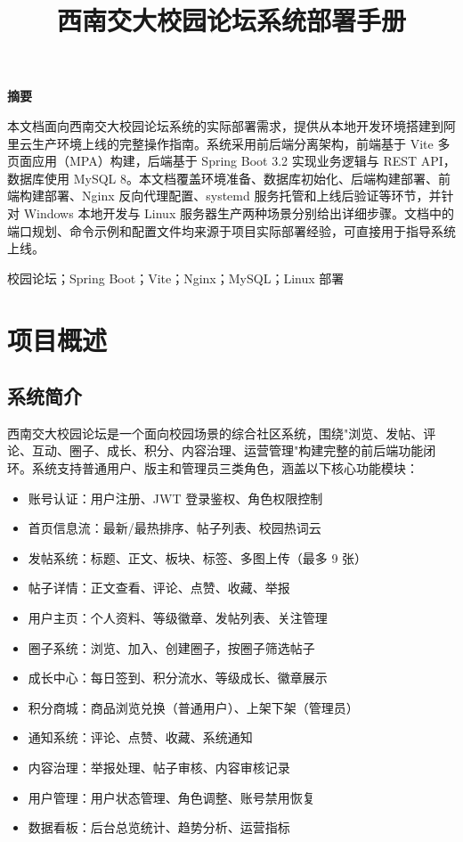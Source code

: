 \documentclass[bwprint]{report}
\title{西南交大校园论坛系统部署手册}
\begin{document}
\maketitle
\newpage

\pagestyle{plain}
\begin{center}
    {\bfseries 摘要}
\end{center}

本文档面向西南交大校园论坛系统的实际部署需求，提供从本地开发环境搭建到阿里云生产环境上线的完整操作指南。系统采用前后端分离架构，前端基于 Vite 多页面应用（MPA）构建，后端基于 Spring Boot 3.2 实现业务逻辑与 REST API，数据库使用 MySQL 8。本文档覆盖环境准备、数据库初始化、后端构建部署、前端构建部署、Nginx 反向代理配置、systemd 服务托管和上线后验证等环节，并针对 Windows 本地开发与 Linux 服务器生产两种场景分别给出详细步骤。文档中的端口规划、命令示例和配置文件均来源于项目实际部署经验，可直接用于指导系统上线。

\vspace{0.5em}
校园论坛；Spring Boot；Vite；Nginx；MySQL；Linux 部署

\newpage
\tableofcontents
\newpage
\pagestyle{plain}

\setcounter{page}{1}

\section{项目概述}

\subsection{系统简介}

西南交大校园论坛是一个面向校园场景的综合社区系统，围绕"浏览、发帖、评论、互动、圈子、成长、积分、内容治理、运营管理"构建完整的前后端功能闭环。系统支持普通用户、版主和管理员三类角色，涵盖以下核心功能模块：

\begin{itemize}
    \item 账号认证：用户注册、JWT 登录鉴权、角色权限控制
    \item 首页信息流：最新/最热排序、帖子列表、校园热词云
    \item 发帖系统：标题、正文、板块、标签、多图上传（最多 9 张）
    \item 帖子详情：正文查看、评论、点赞、收藏、举报
    \item 用户主页：个人资料、等级徽章、发帖列表、关注管理
    \item 圈子系统：浏览、加入、创建圈子，按圈子筛选帖子
    \item 成长中心：每日签到、积分流水、等级成长、徽章展示
    \item 积分商城：商品浏览兑换（普通用户）、上架下架（管理员）
    \item 通知系统：评论、点赞、收藏、系统通知
    \item 内容治理：举报处理、帖子审核、内容审核记录
    \item 用户管理：用户状态管理、角色调整、账号禁用恢复
    \item 数据看板：后台总览统计、趋势分析、运营指标
\end{itemize}
\end{document}
